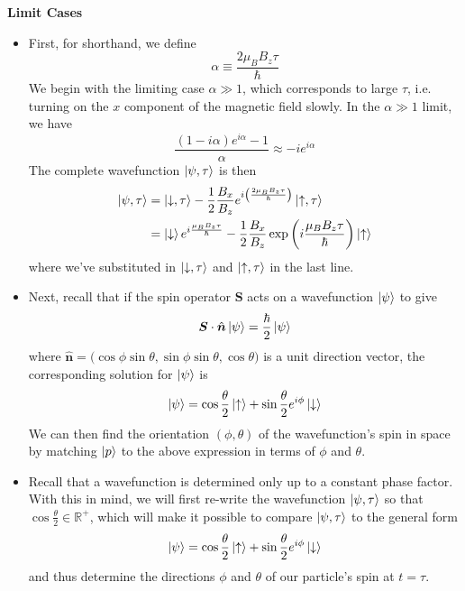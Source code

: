 \documentclass[11pt, a4paper]{article}
\renewcommand{\vec}[1]{\bm{#1}} %
\newcommand{\uvec}[1]{\hat{\vec{#1}}} %
\newcommand{\p}{\psi}  %
\newcommand{\ua}{\uparrow}  %
\newcommand{\da}{\downarrow}  %
\begin{document}
\textbf{Limit Cases}
\begin{itemize}	
	\item First, for shorthand, we define
	\begin{equation*}
		\alpha \equiv \frac{2\mu_{B}B_{z}\tau}{\hbar}
	\end{equation*}
	We begin with the limiting case $ \alpha \gg 1 $, which corresponds to large $ \tau $, i.e. turning on the $ x $ component of the magnetic field slowly. In the $ \alpha \gg 1 $ limit, we have
	\begin{equation*}
		\frac{(1 - i\alpha)e^{i\alpha}-1}{\alpha} \approx - i e^{i\alpha}
	\end{equation*}
	The complete wavefunction $ \ket{\p, \tau} $ is then
	\begin{align*}
		\ket{\p, \tau} &= \ket{\da, \tau} -\frac{1}{2}\frac{B_{x}}{B_{z}} e^{i\left(\frac{2\mu_{B}B_{z}\tau}{\hbar}\right)}\ket{\ua, \tau}\\
		& = \ket{\da}e^{i\frac{\mu_{B}B_{z}\tau}{\hbar}} - \frac{1}{2}\frac{B_{x}}{B_{z}}\exp\left(i \frac{\mu_{B}B_{z}\tau}{\hbar}\right)\ket{\ua}
	\end{align*}
	where we've substituted in $ \ket{\da, \tau} $ and $ \ket{\ua, \tau} $ in the last line.
	
	\item Next, recall that if the spin operator $ \vec{S} $ acts on a wavefunction $ \ket{\p} $ to give
	\begin{equation*}
		\vec{S}\cdot \uvec{n} \ket{\p} = \frac{\hbar}{2} \ket{\p}
	\end{equation*}
	where $ \uvec{n} = \big(\cos \phi \sin \theta, \sin \phi \sin \theta, \cos \theta\big) $ is a unit direction vector, the corresponding solution for $ \ket{\p} $ is
	\begin{equation*}
		\ket{\p} = \cos \frac{\theta}{2}\ket{\ua} + \sin \frac{\theta}{2}e^{i\phi}\ket{\da}
	\end{equation*}
	We can then find the orientation $ (\phi, \theta) $ of the wavefunction's spin in space by matching $ \ket{p} $ to the above expression in terms of $ \phi $ and $ \theta $.
	
	\item Recall that a wavefunction is determined only up to a constant phase factor. With this in mind, we will first re-write the wavefunction $ \ket{\p, \tau} $ so that $ \cos \frac{\theta}{2} \in \mathbb{R}^{+} $, which will make it possible to compare $ \ket{\p, \tau} $ to the general form
	\begin{equation*}
		\ket{\p} = \cos \frac{\theta}{2}\ket{\ua} + \sin \frac{\theta}{2}e^{i\phi}\ket{\da}
	\end{equation*}
	and thus determine the directions $ \phi $ and $ \theta $ of our particle's spin at $ t = \tau $.
	

\end{itemize}
\end{document}
